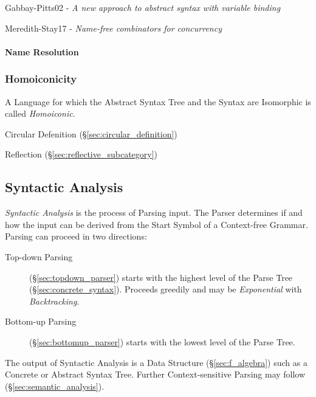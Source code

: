 Gabbay-Pitts02 - \emph{A new approach to abstract syntax with variable binding}

Meredith-Stay17 - \emph{Name-free combinators for concurrency}



\paragraph{Name Resolution}\label{sec:name_resolution}\hfill




\subsubsection{Homoiconicity}\label{sec:homoiconicity}

A Language for which the Abstract Syntax Tree and the Syntax are
Isomorphic is called \emph{Homoiconic}.

Circular Defenition (\S\ref{sec:circular_definition})

Reflection (\S\ref{sec:reflective_subcategory})



\subsection{Syntactic Analysis}\label{sec:syntactic_analysis}

\emph{Syntactic Analysis} is the process of Parsing input. The Parser
determines if and how the input can be derived from the Start Symbol
of a Context-free Grammar. Parsing can proceed in two directions:
\begin{description}
\item [Top-down Parsing] (\S\ref{sec:topdown_parser}) starts with
  the highest level of the Parse Tree (\S\ref{sec:concrete_syntax}).
  Proceeds greedily and may be \emph{Exponential} with
  \emph{Backtracking}.
\item [Bottom-up Parsing] (\S\ref{sec:bottomup_parser}) starts with
  the lowest level of the Parse Tree.
\end{description}
The output of Syntactic Analysis is a Data Structure
(\S\ref{sec:f_algebra}) such as a Concrete or Abstract Syntax Tree.
Further Context-sensitive Parsing may follow
(\S\ref{sec:semantic_analysis}).



